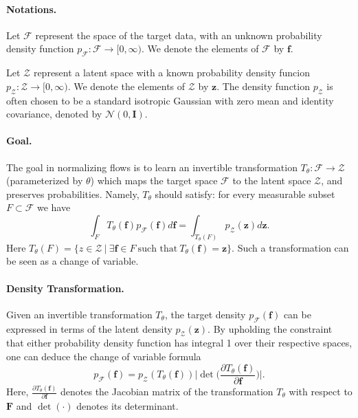 \documentclass[letterpaper]{article} %
\newcommand{\ron}[1]{{{\textcolor{red}{\textbf{[Ron:} {#1}\textbf{]}}}}}
\begin{document}
\paragraph{Notations.}
Let $\mathcal{F}$ represent the space of the target data, with an unknown probability density function $p_\mathcal{F}:\mathcal{F} \rightarrow [0,\infty)$. We denote the elements of $\mathcal{F}$ by $\mathbf{f}$.

Let $\mathcal{Z}$ represent a latent space with a known probability density funcion $p_\mathcal{Z}:\mathcal{Z} \rightarrow [0,\infty)$. We denote the elements of $\mathcal{Z}$ by $\mathbf{z}$. The density function $p_\mathcal{Z}$ is often chosen to be a standard isotropic Gaussian with zero mean and identity covariance, denoted by $\mathcal{N}(0,\mathbf{I})$. 
%

\paragraph{Goal.} The goal in normalizing flows is to learn an invertible transformation $T_\theta: \mathcal{F} \rightarrow  \mathcal{Z}$ (parameterized by $\theta$) which maps the target space $\mathcal{F}$ to the latent space $\mathcal{Z}$, and preserves probabilities. Namely, $T_{\theta}$ should satisfy: for every measurable subset $F\subset \mathcal{F}$ we have
\[\int_F T_{\theta}(\mathbf{f}) p_{\mathcal{F}}(\mathbf{f})d\mathbf{f} = \int_{T_{\theta}(F)}  p_{\mathcal{Z}}(\mathbf{z})d\mathbf{z}.\]
Here $T_{\theta}(F)= \{z\in\mathcal{Z}\ |\ \exists \mathbf{f}\in F\ {\text{such that}}\ T_{\theta}(\mathbf{f})=\mathbf{z}\}$.
Such a transformation can be seen as a change of variable.

\paragraph{Density Transformation.}
Given an invertible transformation $T_\theta$, the target density $p_\mathcal{F}(\mathbf{f})$ can be expressed in terms of the latent density $p_\mathcal{Z}(\mathbf{z})$. By upholding the constraint that either probability density function has integral 1 over their respective spaces, one can deduce the change of variable formula
\[p_\mathcal{F}(\mathbf{f}) = p_\mathcal{Z}(T_\theta(\mathbf{f})) \bigg| \det \bigg( \frac{\partial T_\theta (\mathbf{f})}{\partial  \mathbf{f}}  \bigg) \bigg|. \]
Here, $\frac{\partial T_\theta (\mathbf{f})}{\partial  \mathbf{f}}$ denotes the Jacobian matrix of the transformation $T_\theta$ with respect to $\mathbf{F}$ and $\det(\cdot)$ denotes its determinant.
\end{document}
